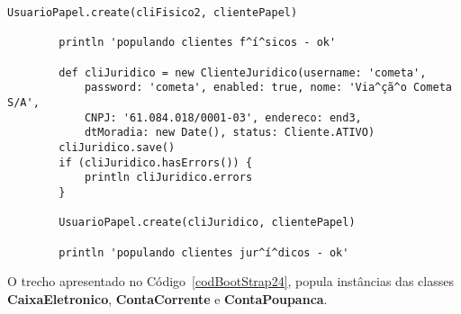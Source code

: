 \begin{lstlisting}[caption={\bf BootStrap.groovy (3)}, frame = trBL, float=htbp,
    label=codBootStrap23]
        UsuarioPapel.create(cliFisico2, clientePapel)
        
        println 'populando clientes f^í^sicos - ok'
                
        def cliJuridico = new ClienteJuridico(username: 'cometa', 
            password: 'cometa', enabled: true, nome: 'Via^çã^o Cometa S/A', 
            CNPJ: '61.084.018/0001-03', endereco: end3,
            dtMoradia: new Date(), status: Cliente.ATIVO) 
        cliJuridico.save()
        if (cliJuridico.hasErrors()) {
            println cliJuridico.errors
        }
        
        UsuarioPapel.create(cliJuridico, clientePapel)
        
        println 'populando clientes jur^í^dicos - ok'
\end{lstlisting}

\newpage


O  trecho  apresentado  no  Código~\ref{codBootStrap24},  popula  instâncias  das
classes {\bf CaixaEletronico}, {\bf ContaCorrente} e {\bf ContaPoupanca}. 

